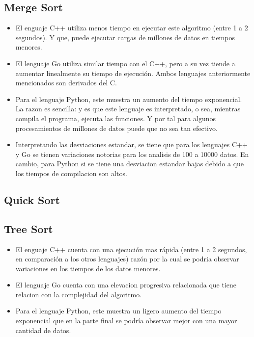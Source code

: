 \documentclass{article}
\begin{document}
    \subsection{Merge Sort} 
    \begin{itemize}
        \item El enguaje C++ utiliza menos tiempo en ejecutar este algoritmo (entre 1 a 2 segundos). Y que, puede ejecutar cargas de millones de datos en tiempos menores. 
        \item El lenguaje Go utiliza similar tiempo con el C++, pero a su vez tiende a aumentar linealmente su tiempo de ejecución. Ambos lenguajes anteriormente mencionados son derivados del C.
        \item Para el lenguaje Python, este muestra un aumento del tiempo exponencial. La razon es sencilla: y es que este lenguaje es interpretado, o sea, mientras compila el programa, ejecuta las funciones. Y por tal para algunos procesamientos de millones de datos puede que no sea tan efectivo.
        \item Interpretando las desviaciones estandar, se tiene que para los lenguajes C++ y Go se tienen variaciones notorias para los analisis de 100 a 10000 datos. En cambio, para Python si se tiene una desviacion estandar bajas debido a que los tiempos de compilacion son altos.
        
    \end{itemize}

    \subsection{Quick Sort}
    
    
    \subsection{Tree Sort}
\begin{itemize}
        \item El enguaje C++ cuenta con una ejecución mas rápida (entre 1 a 2 segundos, en comparación a los otros lenguajes) razón por la cual se podria observar variaciones en los tiempos de los datos menores.
        \item El lenguaje Go cuenta con una elevacion progresiva relacionada que tiene relacion con la complejidad del algoritmo.
        \item Para el lenguaje Python, este muestra un ligero aumento del tiempo exponencial que en la parte final se podría observar mejor con una mayor cantidad de datos.        
    \end{itemize}
\end{document}
